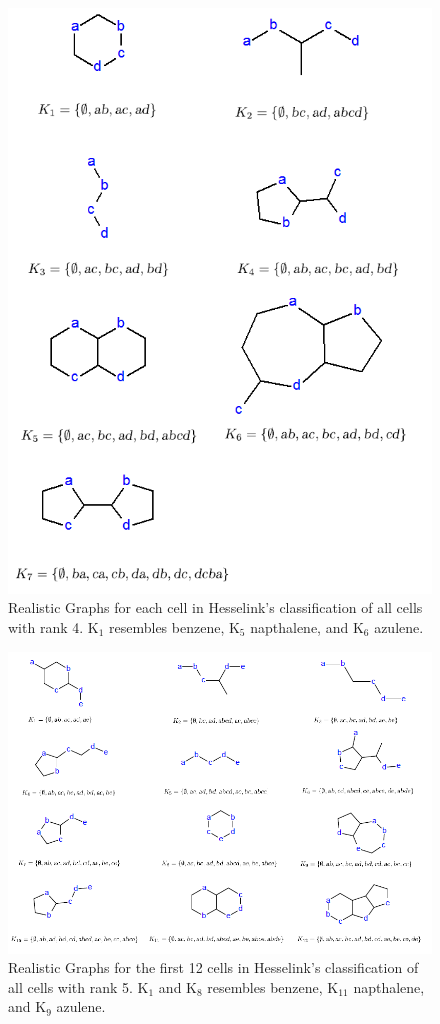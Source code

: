 \documentclass[12pt]{article}
\begin{document}
\begin{figure}[ht!]
\centering
\includegraphics[width=130mm]{rank4Results.png}
\caption{Realistic Graphs for each cell in Hesselink's classification of all cells with rank 4. K$_1$ resembles benzene, K$_5$ napthalene, and K$_6$ azulene.}
\label{fig:rank4Results}
\end{figure}

\begin{figure}[ht!]
\centering
\includegraphics[width=160mm]{rank5Results1.png}
\caption{Realistic Graphs for the first 12 cells in Hesselink's classification of all cells with rank 5. K$_1$ and K$_8$ resembles benzene, K$_{11}$ napthalene, and K$_9$ azulene.}
\label{fig:rank5Results1}
\end{figure}
\end{document}
